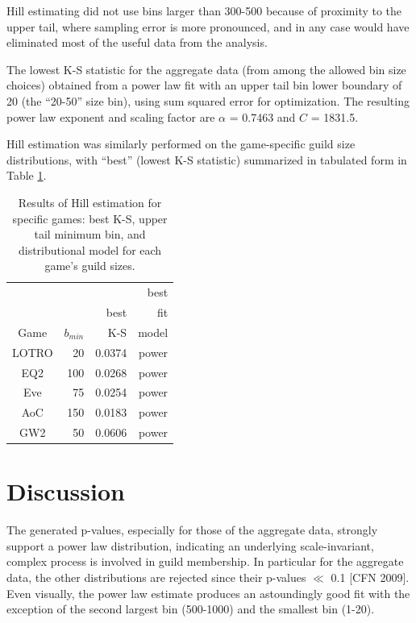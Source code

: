 \documentclass[pdftex,12pt]{llncs}
\begin{document}
Hill estimating did not use bins larger than 300-500 because of proximity to the upper tail, where sampling error is more pronounced, and in any case would have eliminated most of the useful data from the analysis.

The lowest K-S statistic for the aggregate data (from among the allowed bin size choices) obtained from a power law fit with an upper tail bin lower boundary of 20 (the “20-50” size bin), using sum squared error for optimization.  The resulting power law exponent and scaling factor are $\alpha$ = 0.7463 and $C$ = 1831.5.

Hill estimation was similarly performed on the game-specific guild size distributions, with “best” (lowest K-S statistic) summarized in tabulated form in Table \ref{hillestimateresults}.

\begin{table}
	\centering
	\caption{Results of Hill estimation for specific games: best K-S, upper tail minimum bin, and distributional model for each game's guild sizes.}
	\begin{tabular}{|c r r r|}
		\hline
		 & & & best \\
		 & & best & fit \\
		Game & $b_{min}$ & K-S & \hspace{8pt} model \\ 
		\hline
		LOTRO & 20 & \hspace{8pt} 0.0374 & power \\
		\hline
		EQ2 & 100 & \hspace{8pt} 0.0268 & power \\
		\hline
		Eve & 75 & \hspace{8pt} 0.0254 & power \\
		\hline
		AoC & 150 & \hspace{8pt} 0.0183 & power \\
		\hline
		GW2 & 50 & \hspace{8pt} 0.0606 & power \\
		\hline
	\end{tabular}
	\label{hillestimateresults}
\end{table}

\section{Discussion}
The generated p-values, especially for those of the aggregate data, strongly support a power law distribution, indicating an underlying scale-invariant, complex process is involved in guild membership.
In particular for the aggregate data, the other distributions are rejected since their p-values $\ll$ 0.1 [CFN 2009].
Even visually, the power law estimate produces an astoundingly good fit with the exception of the second largest bin (500-1000) and the smallest bin (1-20).
\end{document}
